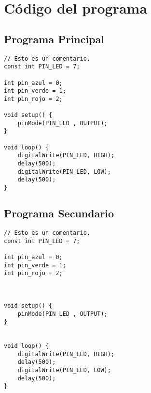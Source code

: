 \chapter{Código del programa}


\section{Programa Principal}

\lstset{style=codestyle, language=C}
\begin{lstlisting}[frame=single]
// Esto es un comentario.
const int PIN_LED = 7;

int pin_azul = 0;           
int pin_verde = 1;
int pin_rojo = 2;

void setup() {
    pinMode(PIN_LED , OUTPUT);
}

void loop() {
    digitalWrite(PIN_LED, HIGH);
    delay(500);
    digitalWrite(PIN_LED, LOW);
    delay(500);
}

\end{lstlisting}


\section{Programa Secundario}

\lstset{style=codestyle, language=C}
\begin{lstlisting}[frame=single]
// Esto es un comentario.
const int PIN_LED = 7;

int pin_azul = 0;           
int pin_verde = 1;
int pin_rojo = 2;



void setup() {
    pinMode(PIN_LED , OUTPUT);
}


void loop() {
    digitalWrite(PIN_LED, HIGH);
    delay(500);
    digitalWrite(PIN_LED, LOW);
    delay(500);
}

\end{lstlisting}
	
	